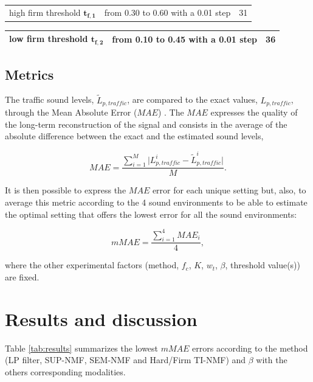 \documentclass[review,5p,twocolumn,sort&compress,times]{elsarticle}
\begin{document}
\begin{table}[t]
\begin{tabularx}{17.5cm}{L{3cm}@{}C{12cm}@{}C{2cm}@{}}
   high firm threshold $\mathbf{t_{f,1}}$ & from 0.30 to 0.60 with a 0.01 step & 31\\
\end{tabularx}

\begin{tabularx}{17.5cm}{L{3cm}@{}C{12cm}@{}C{2cm}@{}}
      low firm threshold $\mathbf{t_{f,2}}$ & from 0.10 to 0.45 with a 0.01 step & 36\\
   \bottomrule
\end{tabularx}
\label{tab:experimental_factorsNMF}
\end{table}

\subsection{Metrics}

The traffic sound levels, $\tilde{L}_{p,traffic}$, are compared to the exact values, $L_{p,traffic}$, through the Mean Absolute Error ($MAE$) \cite{willmott2005advantages}. The $MAE$ expresses the quality of the long-term reconstruction of the signal and consists in the average of the absolute difference between the exact and the estimated sound levels, 

\begin{equation}
MAE = \frac{\sum_{i = 1}^{M} \vert L_{p,traffic}^i - \tilde{L}_{p,traffic}^i \vert}{M}.
\end{equation}

It is then possible to express the $MAE$ error for each unique setting but, also, to average this metric according to the 4 sound environments to be able to estimate the optimal setting that offers the lowest error for all the sound environments:

\begin{equation}
mMAE = \frac{\sum_{i = 1}^4 MAE_i}{4}, 
\end{equation}

where the other experimental factors (method, $f_c$, $K$, $w_t$, $\beta$, threshold value(s)) are fixed. 


\section{Results and discussion}\label{part:results}

Table \ref{tab:results} summarizes the lowest $mMAE$ errors according to the method (LP filter, SUP-NMF, SEM-NMF and Hard/Firm TI-NMF) and $\beta$ with the others corresponding modalities.
\end{document}
